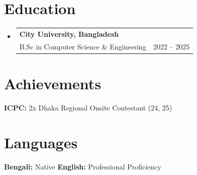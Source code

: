 \documentclass[letterpaper,10.5pt]{article}
\makeatletter
\newcommand{\resumeSubSubheading}[4]{
  \vspace{-2pt}\item
    \begin{tabular*}{0.97\textwidth}[t]{l@{\extracolsep{\fill}}r}
      \textbf{#1} & #2 \\[7pt]
      \small#3 & \small #4 \\
    \end{tabular*}\vspace{-2pt}
}
\newcommand{\resumeSubHeadingListStart}{\begin{itemize}[leftmargin=0.15in, label={}]}
\newcommand{\resumeSubHeadingListEnd}{\end{itemize}}
\makeatother
\begin{document}
\section{Education}
\vspace{4pt}
  \resumeSubHeadingListStart
    \resumeSubSubheading
      {City University, Bangladesh}{}
      {B.Sc in Computer Science \& Engineering}{2022 -- 2025}
  \resumeSubHeadingListEnd



\section{Achievements}
\vspace{4pt}
 \begin{itemize}[leftmargin=0.15in, label={}]
    \small{\item{
     \textbf{ICPC:}{ 2x Dhaka Regional Onsite Contestant (24, 25)} \\[2pt]
    }}
 \end{itemize}

\section{Languages}
\vspace{4pt}
 \begin{itemize}[leftmargin=0.15in, label={}]
    \small{\item{
     \textbf{Bengali:}{ Native} \quad\quad
     \textbf{English:}{ Professional Proficiency}
    }}
 \end{itemize}

\end{document}
